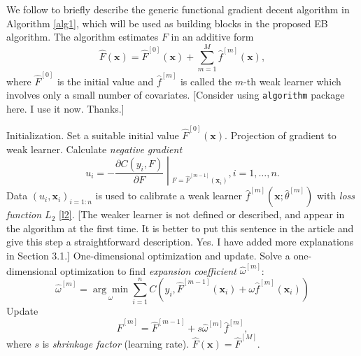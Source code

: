 \documentclass[11pt]{article}
\numberwithin{equation}{section}
\def\bx{\boldsymbol{x}}
\begin{document}
We follow \citet{buehlmann:2003} to briefly describe the generic functional gradient decent algorithm in Algorithm \ref{alg1}, which will be used as building blocks in the proposed EB algorithm. 
The algorithm estimates $F$ in an additive form
$$\hat{F}(\bx)=\hat{F}^{[0]}(\bx)+\sum_{m=1}^M\hat{f}^{[m]}(\bx),$$
where $\hat{F}^{[0]}$ is the initial value and $\hat{f}^{[m]}$ is called the $m$-th weak learner which involves only a small number of covariates.
{\color{blue}[Consider using {\tt algorithm} package here. I use it now. Thanks.]}
\begin{algorithm}[htp!] %
	\caption{The generic functional gradient decent algorithm.} %
	\label{alg1} %
	\begin{algorithmic}[1] %
		\STATE Initialization. Set a suitable initial value $\hat{F}^{[0]}(\bx).$  
		\STATE Projection of gradient to weak learner.
		Calculate \textit{negative gradient} $$u_i=\left.-\frac{\partial C(y_i,F)}{\partial F}\middle|_{F=\hat{F}^{[m-1]}(\bx_i)}\right., i=1,\ldots,n.$$
		Data $(u_i,\bx_i)_{i=1:n}$ is used to calibrate a weak learner $\hat{f}^{[m]}(\bx;\hat{\theta}^{[m]})$ with \textit{loss function $L_2$} \eqref{l2}.{\color{blue} [The weaker learner is not defined or described, and appear in the algorithm at the first time. It is better to put this sentence in the article and give this step a straightforward description. Yes. I have added more explanations in Section 3.1.]}
		\STATE One-dimensional optimization and update.
		Solve a one-dimensional optimization  to find \textit{expansion coefficient} $\hat{\omega}^{[m]}$:
		$$\hat{\omega}^{[m]}=\underset{\omega}{\arg\min}\sum_{i=1}^n C(y_i, \hat{F}^{[m-1]}(\bx_i)+\omega\hat{f}^{[m]}(\bx_i))$$
		Update $$\hat{F}^{[m]}=\hat{F}^{[m-1]}+s\hat{\omega}^{[m]}\hat{f}^{[m]},$$
		where $s$ is \textit{shrinkage factor} (learning rate).
		\ENDFOR
		\RETURN $\hat{F}(\bx)=\hat{F}^{[M]}$.
	\end{algorithmic}
\end{algorithm}
\end{document}
